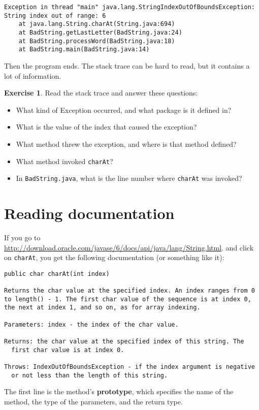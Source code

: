 \documentclass[12pt]{book}
\theoremstyle{definition}
\newtheorem{excz}{Exercise}[chapter]
\newenvironment{exercise}{\bigskip\begin{excz}\mbox{}}{\end{excz}}
\begin{document}
\begin{lstlisting}
Exception in thread "main" java.lang.StringIndexOutOfBoundsException:
String index out of range: 6
	at java.lang.String.charAt(String.java:694)
	at BadString.getLastLetter(BadString.java:24)
	at BadString.processWord(BadString.java:18)
	at BadString.main(BadString.java:14)
\end{lstlisting}

Then the program ends.
The stack trace can be hard to read, but it contains a lot of information.

\begin{exercise}
Read the stack trace and answer these questions:

\begin{itemize}

\item What kind of Exception occurred, and what package is it defined
in?

\item What is the value of the index that caused the exception?

\item What method threw the exception, and where is
that method defined?

\item What method invoked {\tt charAt}?

\item In {\tt BadString.java}, what is the line number where {\tt charAt}
was invoked?

\end{itemize}

\end{exercise}


\section{Reading documentation}
\label{documentation}

If you go to
\url{http://download.oracle.com/javase/6/docs/api/java/lang/String.html}.
and click on {\tt charAt}, you get the following documentation
(or something like it):

\begin{lstlisting}
public char charAt(int index)

Returns the char value at the specified index. An index ranges from 0
to length() - 1. The first char value of the sequence is at index 0,
the next at index 1, and so on, as for array indexing.

Parameters: index - the index of the char value.

Returns: the char value at the specified index of this string. The
  first char value is at index 0.

Throws: IndexOutOfBoundsException - if the index argument is negative
  or not less than the length of this string.
\end{lstlisting}
%
The first line is the method's {\bf prototype}, which specifies the
name of the method, the type of the parameters, and the return type.
\end{document}
